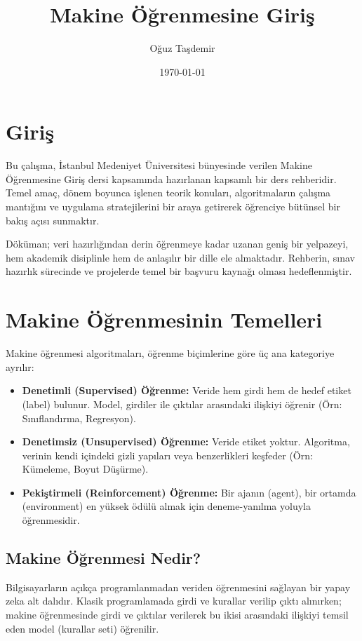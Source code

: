 \documentclass[12pt,a4paper]{article}
\title{\Huge \textbf{Makine Öğrenmesine Giriş}}
\author{Oğuz Taşdemir}
\date{\today}
\begin{document}
\maketitle
\newpage

\tableofcontents
\newpage

\section*{Giriş}
Bu çalışma, İstanbul Medeniyet Üniversitesi bünyesinde verilen Makine Öğrenmesine Giriş dersi kapsamında hazırlanan kapsamlı bir ders rehberidir. Temel amaç, dönem boyunca işlenen teorik konuları, algoritmaların çalışma mantığını ve uygulama stratejilerini bir araya getirerek öğrenciye bütünsel bir bakış açısı sunmaktır. 

Döküman; veri hazırlığından derin öğrenmeye kadar uzanan geniş bir yelpazeyi, hem akademik disiplinle hem de anlaşılır bir dille ele almaktadır. Rehberin, sınav hazırlık sürecinde ve projelerde temel bir başvuru kaynağı olması hedeflenmiştir.

\newpage
\section{Makine Öğrenmesinin Temelleri}
Makine öğrenmesi algoritmaları, öğrenme biçimlerine göre üç ana kategoriye ayrılır:

\begin{itemize}
    \item \textbf{Denetimli (Supervised) Öğrenme:} Veride hem girdi hem de hedef etiket (label) bulunur. Model, girdiler ile çıktılar arasındaki ilişkiyi öğrenir (Örn: Sınıflandırma, Regresyon).
    \item \textbf{Denetimsiz (Unsupervised) Öğrenme:} Veride etiket yoktur. Algoritma, verinin kendi içindeki gizli yapıları veya benzerlikleri keşfeder (Örn: Kümeleme, Boyut Düşürme).
    \item \textbf{Pekiştirmeli (Reinforcement) Öğrenme:} Bir ajanın (agent), bir ortamda (environment) en yüksek ödülü almak için deneme-yanılma yoluyla öğrenmesidir.
\end{itemize}

\subsection{Makine Öğrenmesi Nedir?}
Bilgisayarların açıkça programlanmadan veriden öğrenmesini sağlayan bir yapay zeka alt dalıdır. Klasik programlamada girdi ve kurallar verilip çıktı alınırken; makine öğrenmesinde girdi ve çıktılar verilerek bu ikisi arasındaki ilişkiyi temsil eden model (kurallar seti) öğrenilir.
\end{document}
